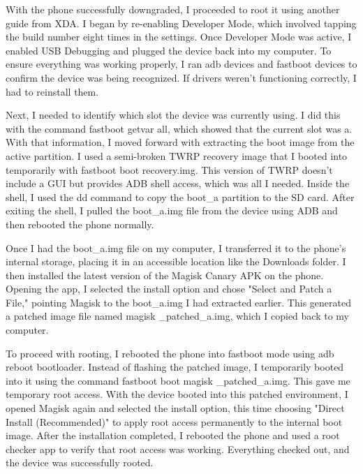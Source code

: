 With the phone successfully downgraded, I proceeded to root it using another guide 
from XDA. I began by re-enabling Developer Mode, which involved tapping the build number eight times in the settings. Once Developer Mode was active, I enabled USB Debugging and plugged the device back into my computer. To ensure everything was working properly, I ran adb devices and fastboot devices to confirm the device was being recognized. If drivers weren’t functioning correctly, I had to reinstall them.

Next, I needed to identify which slot the device was currently using. I did this with the command fastboot getvar all, which showed that the current slot was a. With that information, I moved forward with extracting the boot image from the active partition. I used a semi-broken TWRP recovery image that I booted into temporarily with fastboot boot recovery.img. This version of TWRP doesn’t include a GUI but provides ADB shell access, which was all I needed. Inside the shell, I used the dd command to copy the boot\_a partition to the SD card. After exiting the shell, I pulled the boot\_a.img file from the device using ADB and then rebooted the phone normally.

Once I had the boot\_a.img file on my computer, I transferred it to the phone’s internal storage, placing it in an accessible location like the Downloads folder. I then installed the latest version of the Magisk Canary APK on the phone. Opening the app, I selected the install option and chose "Select and Patch a File," pointing Magisk to the boot\_a.img I had extracted earlier. This generated a patched image file named magisk \_patched\_a.img, which I copied back to my computer.

To proceed with rooting, I rebooted the phone into fastboot mode using adb reboot bootloader. Instead of flashing the patched image, I temporarily booted into it using the command fastboot boot magisk \_patched\_a.img. This gave me temporary root access. With the device booted into this patched environment, I opened Magisk again and selected the install option, this time choosing "Direct Install (Recommended)" to apply root access permanently to the internal boot image.
After the installation completed, I rebooted the phone and used a root checker app to verify that root access was working. Everything checked out, and the device was successfully rooted.

